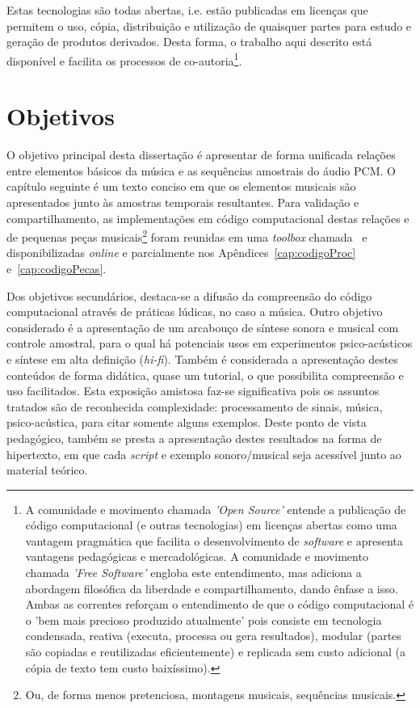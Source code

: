 Estas tecnologias são todas abertas, i.e. estão publicadas em licenças que permitem o uso, cópia, distribuição e utilização de quaisquer partes para estudo e geração de produtos derivados. Desta forma, o trabalho aqui descrito está disponível e facilita os processos de co-autoria\footnote{A comunidade e movimento chamada \emph{'Open Source'} entende a publicação de código computacional (e outras tecnologias) em licenças abertas como uma vantagem pragmática que facilita o desenvolvimento de \emph{software} e apresenta vantagens pedagógicas e mercadológicas. A comunidade e movimento chamada \emph{'Free Software'} engloba este entendimento, mas adiciona a abordagem filosófica da liberdade e compartilhamento, dando ênfase a isso. Ambas as correntes reforçam o entendimento de que o código computacional é o 'bem mais precioso produzido atualmente' pois consiste em tecnologia condensada, reativa (executa, processa ou gera resultados), modular (partes são copiadas e reutilizadas eficientemente) e replicada sem custo adicional (a cópia de texto tem custo baixíssimo).\cite{Raymond,Lessig}}.

    \section{Objetivos}
   \label{sec:objetivos}
   O objetivo principal desta dissertação é apresentar de forma unificada relações entre elementos básicos da música e as sequências amostrais do áudio PCM. O capítulo seguinte é um texto conciso em que os elementos musicais são apresentados junto às amostras temporais resultantes. Para validação e compartilhamento, as implementações em código computacional destas relações e de pequenas peças musicais\footnote{Ou, de forma menos pretenciosa, montagens musicais, sequências musicais.} foram reunidas em uma \emph{toolbox} chamada \massa\ e disponibilizadas \emph{online} e parcialmente nos Apêndices~\ref{cap:codigoProc} e~\ref{cap:codigoPecas}. 

Dos objetivos secundários, destaca-se a difusão da compreensão do código computacional através de práticas lúdicas, no caso a música. Outro objetivo considerado é a apresentação de um arcabouço de síntese sonora e musical com controle amostral, para o qual há potenciais usos em experimentos psico-acústicos e síntese em alta definição (\emph{hi-fi}). Também é considerada a apresentação destes conteúdos de forma didática, quase um tutorial, o que possibilita compreensão e uso facilitados. Esta exposição amistosa faz-se significativa pois os assuntos tratados são de reconhecida complexidade: processamento de sinais, música, psico-acústica, para citar somente alguns exemplos. Deste ponto de vista pedagógico, também se presta a apresentação destes resultados na forma de hipertexto, em que cada \emph{script} e exemplo sonoro/musical seja acessível junto ao material teórico.

